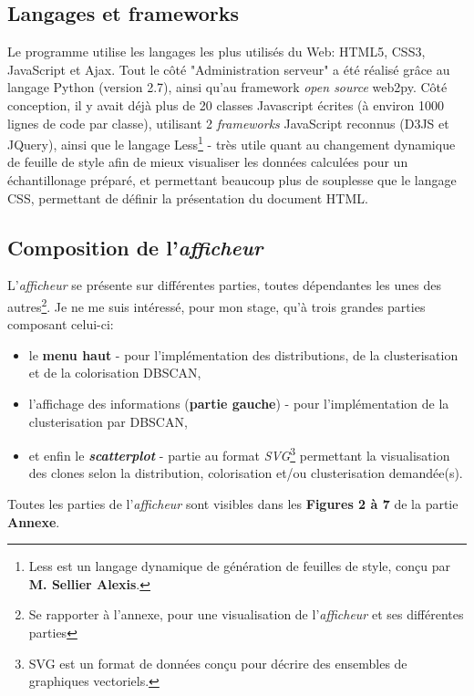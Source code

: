 \documentclass[12pt]{report}
\begin{document}
\begin{spacing}{1.2}
\subsection{Langages et frameworks}
Le programme utilise les langages les plus utilisés du Web: HTML5, CSS3, JavaScript et Ajax.
\newline
Tout le côté "Administration serveur" a été réalisé grâce au langage Python (version 2.7), ainsi qu'au framework \textit{open source} web2py.
\newline
Côté conception, il y avait déjà plus de 20 classes Javascript écrites (à environ 1000 lignes de code par classe), utilisant 2 \textit{frameworks} JavaScript reconnus (D3JS et JQuery), ainsi que le langage Less\footnote{Less est un langage dynamique de génération de feuilles de style, conçu par \textbf{M. Sellier Alexis}.} - très utile quant au changement dynamique de feuille de style afin de mieux visualiser les données calculées pour un échantillonage préparé, et permettant beaucoup plus de souplesse que le langage CSS, permettant de définir la présentation du document HTML.

\subsection{Composition de l'\textit{afficheur}}

L'\textit{afficheur} se présente sur différentes parties, toutes dépendantes les unes des autres\footnote{Se rapporter à l'annexe, pour une visualisation de l'\textit{afficheur} et ses différentes parties}.
\newline Je ne me suis intéressé, pour mon stage, qu'à trois grandes parties composant celui-ci:
\begin{itemize}
\item{le \textbf{menu haut} - pour l'implémentation des distributions, de la clusterisation et de la colorisation DBSCAN,}
\item{l'affichage des informations (\textbf{partie gauche}) - pour l'implémentation de la clusterisation par DBSCAN,}
\item{et enfin le \textbf{\textit{scatterplot}} - partie au format \textit{SVG}\footnote{SVG est un format de données conçu pour décrire des ensembles de graphiques vectoriels.} permettant la visualisation des clones selon la distribution, colorisation et/ou clusterisation demandée(s).}
\end{itemize}
Toutes les parties de l'\textit{afficheur} sont visibles dans les \textbf{Figures 2 à 7} de la partie \textbf{Annexe}.


\end{spacing}
\end{document}
